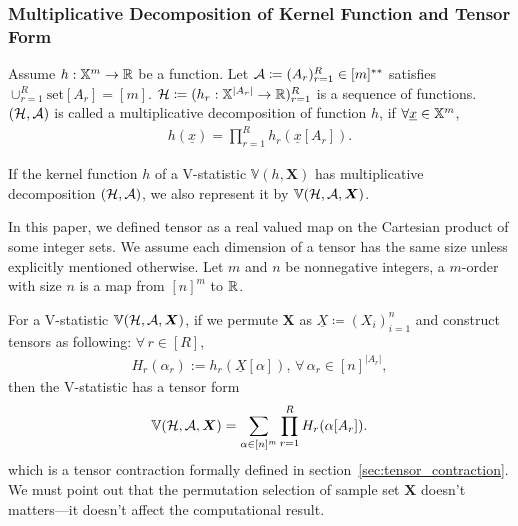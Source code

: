 \documentclass[letterpaper,11pt]{article}
\newcommand{\vstat}{\mathbb{V}}
\newcommand{\vstatp}[2]{\vstat(#1,#2)}
\newcommand{\samplespace}{\bbX}
\newcommand{\takesetp}[1]{\mathrm{set}[#1]}
\begin{document}
\begin{bibunit}[plainnat]
\subsubsection{Multiplicative Decomposition of Kernel Function and Tensor Form}

\begin{definition}\label{def:multiplicative_decomposition}
Assume $h : \samplespace^m \to \reals$ be a function. Let ${\mathcal{A}} \coloneqq (A_r)_{r=1}^R \in [m]^{**}$ satisfies $\cup_{r=1}^R \takesetp{A_r} = [m]$. $\calH \coloneqq (h_r : \samplespace^{|A_r|} \to \reals)_{r=1}^R$ is a sequence of functions. $({\mathcal{H}}, {\mathcal{A}})$ is called a multiplicative decomposition of function $h$, if $\forall \underline{x} \in \samplespace^m$, 
\begin{align*}
    h(\underline{x}) = \prod_{r=1}^R h_r(\underline{x}[A_r]). 
\end{align*}
\end{definition}

\begin{remark}
    If the kernel function $h$ of a V-statistic $\vstatp{h}{\bm{X}}$ has multiplicative decomposition $({\mathcal{H}}, {\mathcal{A}})$, we also represent it by $\vstat(\calH, \calA, \bm{X})$. 
\end{remark}

In this paper, we defined tensor as a real valued map on the Cartesian product of some integer sets. We assume each dimension of a tensor has the same size unless explicitly mentioned otherwise. Let $m$ and $n$ be nonnegative integers, a $m$-order with size $n$ is a map from $[n]^m$ to ${\mathbb{R}}$. 

For a V-statistic $\vstat(\calH, \calA, \bm{X})$, if we permute $\bm{X}$ as $\underline{X} \coloneqq (X_i)_{i=1}^n$ and construct tensors as following: $\forall \, r \in [R]$, 
\begin{align*}
    H_r(\alpha_r) := h_r(\underline{X}[\alpha]), \, \forall \, \alpha_r \in [n]^{|A_r|}, 
\end{align*}
then the V-statistic has a tensor form
\begin{align*}
    \vstat(\calH, \calA, \bm{X}) = \sum_{\alpha \in [n]^m} \prod_{r=1}^R H_r(\alpha[A_r]). 
\end{align*}
which is a tensor contraction formally defined in section~\ref{sec:tensor_contraction}. We must point out that the permutation selection of sample set $\bm{X}$ doesn't matters---it doesn't affect the computational result. 


\end{bibunit}
\end{document}
